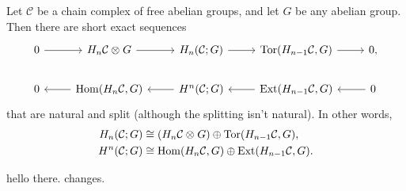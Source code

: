 \documentclass[twoside,10pt]{article}
\begin{document}
\begin{thrm}
Let $\mathcal{C}$ be a chain complex of free abelian groups, and let $G$ be any abelian group. Then there are short exact sequences
\[
\begin{tikzcd}
	0 \rar & H_{n}\mathcal{C} \otimes_{}G \rar & H_{n}(\mathcal{C};G) \rar & \tor(H_{n-1}\mathcal{C},G) \rar & 0, \\
	0 & \lar \hom(H_{n}\mathcal{C},G) & \lar H^{n}(\mathcal{C};G) & \lar \ext(H_{n-1}\mathcal{C},G) & \lar 0
\end{tikzcd}
\] that are natural and split (although the splitting isn't natural). In other words,
\begin{align*}
	H_{n}(\mathcal{C};G) &\cong (H_{n}\mathcal{C} \otimes_{}G) \oplus \operatorname{Tor}(H_{n-1}\mathcal{C},G),\\
	H^{n}(\mathcal{C};G) &\cong \operatorname{Hom}(H_{n}\mathcal{C},G) \oplus \operatorname{Ext}(H_{n-1}\mathcal{C},G).
\end{align*}
\end{thrm}

hello there. changes.
\end{document}
